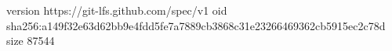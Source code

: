 version https://git-lfs.github.com/spec/v1
oid sha256:a149f32e63d62bb9e4fdd5fe7a7889cb3868c31e23266469362cb5915ec2c78d
size 87544
